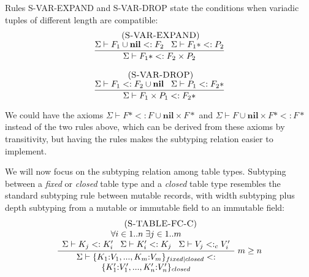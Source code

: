 \documentclass{sigplanconf}
\newcommand{\Nil}{\mathbf{nil}}
\newcommand{\mylabel}[1]{\; (\textsc{#1})}
\newcommand{\senv}{\Sigma}
\newcommand{\subtype}{<:}
\begin{document}
Rules {\sc S-VAR-EXPAND} and {\sc S-VAR-DROP} state the
conditions when variadic tuples of different length are
compatible:
\[
\begin{array}{c}
\begin{array}{c}
\mylabel{S-VAR-EXPAND}\\
\dfrac{\senv \vdash F_{1} \cup \Nil \subtype F_{2} \;\;\;
       \senv \vdash F_{1}{*} \subtype P_{2}}
      {\senv \vdash F_{1}{*} \subtype F_{2} \times P_{2}}
\end{array}
\\ \\
\begin{array}{c}
\mylabel{S-VAR-DROP}\\
\dfrac{\senv \vdash F_{1} \subtype F_{2} \cup \Nil \;\;\;
       \senv \vdash P_{1} \subtype F_{2}{*}}
      {\senv \vdash F_{1} \times P_{1} \subtype F_{2}{*}}
\end{array}
\end{array}
\]

We could have the axioms $\senv \vdash F{*} \subtype F \cup \Nil \times F{*}$ and $\senv \vdash F \cup \Nil \times F{*}  \subtype F{*}$ instead of the two rules above, which can be derived
from these axioms by transitivity, but having the rules makes
the subtyping relation easier to implement.

We will now focus on the subtyping relation among table
types. Subtyping between a {\em fixed} or {\em closed}
table type and a {\em closed} table type resembles the
standard subtyping rule between mutable records, with
width subtyping plus depth subtyping from a mutable
or immutable field to an immutable field:
\[
\begin{array}{c}
\mylabel{S-TABLE-FC-C}\\
\dfrac{\begin{array}{c}
       \forall i \in 1..n \; \exists j \in 1..m \\
       \senv \vdash K_{j} \subtype K_{i}' \;\;\;
       \senv \vdash K_{i}' \subtype K_{j} \;\;\;
       \senv \vdash V_{j} \subtype_{c} V_{i}'
       \end{array}}
      {\begin{array}{c}
       \senv \vdash \{K_{1}{:}V_{1}, ..., K_{m}{:}V_{m}\}_{fixed|closed} \subtype\\
                    \{K_{1}'{:}V_{1}', ..., K_{n}'{:}V_{n}'\}_{closed}
       \end{array}} \; m \ge n
\end{array}
\]
\end{document}

